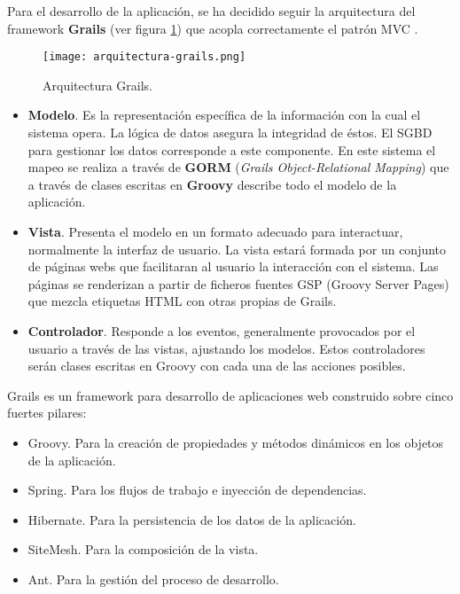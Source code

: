 Para el desarrollo de la aplicación, se ha decidido seguir la arquitectura del framework \textbf{Grails} (ver figura \ref{fig:arquitectura-grails}) que acopla correctamente el patrón MVC \cite{brito2009}.

\begin{figure}[!hp]
	\begin{center} 
		\texttt{[image: arquitectura-grails.png]}
		\caption{Arquitectura Grails.}
		\label{fig:arquitectura-grails}
	\end{center}
\end{figure}

\begin{itemize}
	\item \textbf{Modelo}. Es la representación específica de la información con la cual el sistema opera. La lógica de datos asegura la integridad de éstos. El SGBD para gestionar los datos corresponde a este componente. En este sistema el mapeo se realiza a través de \textbf{GORM} (\textit{Grails Object-Relational Mapping}) que a través de clases escritas en \textbf{Groovy} describe todo el modelo de la aplicación.
	\item \textbf{Vista}. Presenta el modelo en un formato adecuado para interactuar, normalmente la interfaz de usuario. La vista estará formada por un conjunto de páginas webs que facilitaran al usuario la interacción con el sistema. Las páginas se renderizan a partir de ficheros fuentes GSP (Groovy Server Pages) que mezcla etiquetas HTML con otras propias de Grails.
	\item \textbf{Controlador}. Responde a los eventos, generalmente provocados por el usuario a través de las vistas, ajustando los modelos. Estos controladores serán clases escritas en Groovy con cada una de las acciones posibles.
\end{itemize}

Grails es un framework para desarrollo de aplicaciones web construido sobre cinco fuertes pilares:

\begin{itemize}
	\item Groovy. Para la creación de propiedades y métodos dinámicos en los objetos de la aplicación.
	\item Spring. Para los flujos de trabajo e inyección de dependencias.
	\item Hibernate. Para la persistencia de los datos de la aplicación.
	\item SiteMesh. Para la composición de la vista.
	\item Ant. Para la gestión del proceso de desarrollo.
\end{itemize}

